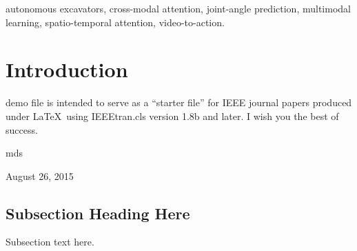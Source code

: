 \documentclass[journal]{IEEEtran}
\begin{document}
\begin{IEEEkeywords}
autonomous excavators, cross-modal attention, joint-angle prediction,
multimodal learning, spatio-temporal attention, video-to-action.
\end{IEEEkeywords}






%
\IEEEpeerreviewmaketitle



\section{Introduction}
\label{sec:introduction}
\iffalse
% 
% 
% 
% 
 demo file is intended to serve as a ``starter file''
for IEEE journal papers produced under \LaTeX\ using
IEEEtran.cls version 1.8b and later.
I wish you the best of success.

\hfill mds
 
\hfill August 26, 2015

\subsection{Subsection Heading Here}
Subsection text here.

\end{document}
